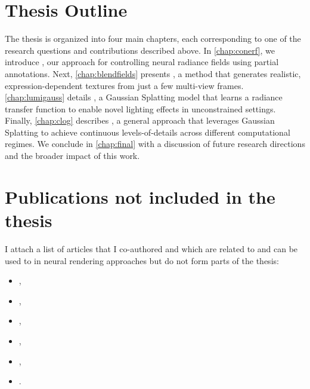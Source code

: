 \section{Thesis Outline}
  The thesis is organized into four main chapters, each corresponding to one of
  the research questions and contributions described above.
  In \cref{chap:conerf}, we introduce \conerf, our approach for controlling
  neural radiance fields using partial annotations.
  Next, \cref{chap:blendfields} presents \blendfields, a method that generates
  realistic, expression-dependent textures from just a few multi-view frames.
  \cref{chap:lumigauss} details \lumigauss, a Gaussian
  Splatting model that learns a radiance transfer function to enable novel lighting
  effects in unconstrained settings.
  Finally, \cref{chap:clog} describes \clog, a general approach that leverages
  Gaussian Splatting to achieve continuous levels-of-details across different
  computational regimes.
  We conclude in \cref{chap:final} with a discussion of future research
  directions and the broader impact of this work.

\section{Publications not included in the thesis}
  I attach a list of articles that I co-authored and which are related to and can be used to in neural
  rendering approaches but do not form parts of the thesis:
  \begin{itemize}
    \item\!\!\!,
    \item\!\!\!,
    \item\!\!\!\!\!,
    \item\!\!\!\!,
    \item\!\!\!,
    \item\!\!\!\!.
  \end{itemize}

